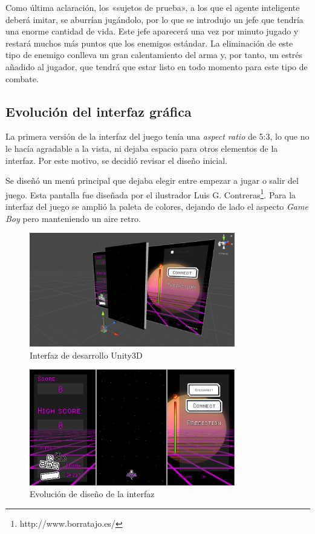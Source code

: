 Como última aclaración, los «sujetos de prueba», a los que el agente inteligente deberá imitar, se aburrían jugándolo, por lo que se introdujo un jefe que tendría una enorme cantidad de vida. Este jefe aparecerá una vez por minuto jugado y restará muchos más puntos que los enemigos estándar. La eliminación de este tipo de enemigo conlleva un gran calentamiento del arma y, por tanto, un estrés añadido al jugador, que tendrá que estar listo en todo momento para este tipo de combate.

\subsection{Evolución del interfaz gráfica}
La primera versión de la interfaz del juego tenía una \emph{aspect ratio}  de 5:3, lo que no le hacía agradable a la vista, ni dejaba espacio para otros elementos de la interfaz. Por este motivo, se decidió revisar el diseño inicial.

Se diseñó un menú principal que dejaba elegir entre empezar a jugar o salir del juego. Esta pantalla fue diseñada por el ilustrador Luis G. Contreras\footnote{http://www.borratajo.es/}. Para la interfaz del juego se amplió la paleta de colores, dejando de lado el aspecto \emph{Game Boy} pero manteniendo un aire retro.


\begin{figure}[]
\centering
\includegraphics[width=0.8\textwidth]{./img/UnityIfaz}
\caption{Interfaz de desarrollo Unity3D}
\end{figure}


\begin{figure}[]
\centering
\includegraphics[width=0.8\textwidth]{./img/ifaz_v2}
\caption{Evolución de diseño de la interfaz}
\end{figure}

